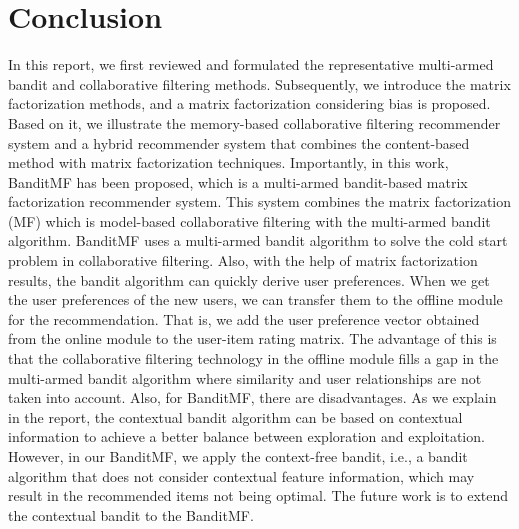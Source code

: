 \chapter{Conclusion}
In this report, we first reviewed and formulated the representative multi-armed bandit and collaborative filtering methods. Subsequently, we introduce the matrix factorization methods, and a matrix factorization considering bias is proposed. Based on it, we illustrate the memory-based collaborative filtering recommender system and a hybrid recommender system that combines the content-based method with matrix factorization techniques. Importantly, in this work, BanditMF has been proposed, which is a multi-armed bandit-based matrix factorization recommender system. This system combines the matrix factorization (MF) which is model-based collaborative filtering with the multi-armed bandit algorithm. BanditMF uses a multi-armed bandit algorithm to solve the cold start problem in collaborative filtering. Also, with the help of matrix factorization results, the bandit algorithm can quickly derive user preferences. When we get the user preferences of the new users, we can transfer them to the offline module for the recommendation. That is, we add the user preference vector obtained from the online module to the user-item rating matrix. The advantage of this is that the collaborative filtering technology in the offline module fills a gap in the multi-armed bandit algorithm where similarity and user relationships are not taken into account. Also, for BanditMF, there are disadvantages. As we explain in the report, the contextual bandit algorithm can be based on contextual information to achieve a better balance between exploration and exploitation. However, in our BanditMF, we apply the context-free bandit, i.e., a bandit algorithm that does not consider contextual feature information, which may result in the recommended items not being optimal. The future work is to extend the contextual bandit to the BanditMF.